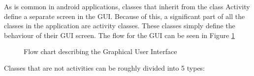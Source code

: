 As is common in android applications, classes that inherit from the class Activity define a separate screen in the GUI. Because of this, a significant part of all the classes in the application are activity classes. These classes simply define the behaviour of their GUI screen. The flow for the GUI can be seen in Figure \ref{fig:GUIFlowchart}
\begin{figure}
\setlength\fboxsep{0pt}
\setlength\fboxrule{1pt}\noindent{}
\caption{Flow chart describing the Graphical User Interface}
\label{fig:GUIFlowchart}
\end{figure}

Classes that are not activities can be roughly divided into 5 types: 

